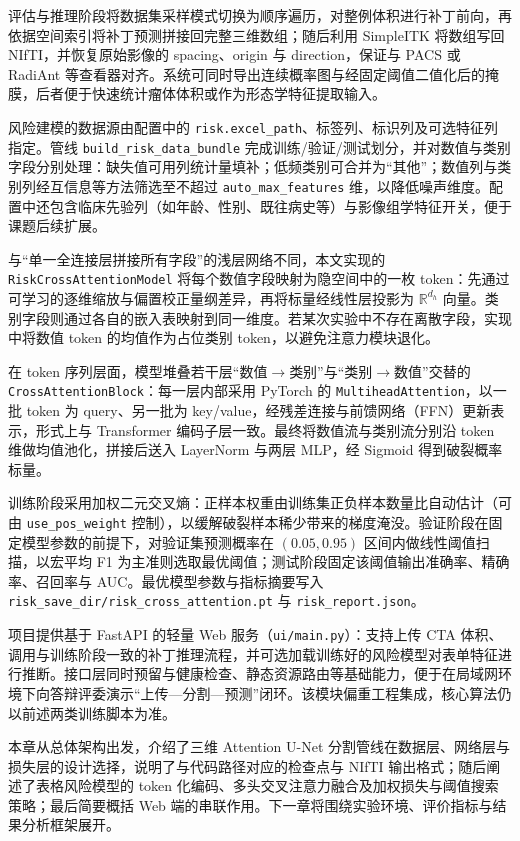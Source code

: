 评估与推理阶段将数据集采样模式切换为顺序遍历，对整例体积进行补丁前向，再依据空间索引将补丁预测拼接回完整三维数组；随后利用 SimpleITK 将数组写回 NIfTI，并恢复原始影像的 spacing、origin 与 direction，保证与 PACS 或 RadiAnt 等查看器对齐。系统可同时导出连续概率图与经固定阈值二值化后的掩膜，后者便于快速统计瘤体体积或作为形态学特征提取输入。

风险建模的数据源由配置中的 \texttt{risk.excel\_path}、标签列、标识列及可选特征列指定。管线 \texttt{build\_risk\_data\_bundle} 完成训练/验证/测试划分，并对数值与类别字段分别处理：缺失值可用列统计量填补；低频类别可合并为“其他”；数值列与类别列经互信息等方法筛选至不超过 \texttt{auto\_max\_features} 维，以降低噪声维度。配置中还包含临床先验列（如年龄、性别、既往病史等）与影像组学特征开关，便于课题后续扩展。

与“单一全连接层拼接所有字段”的浅层网络不同，本文实现的 \texttt{RiskCrossAttentionModel} 将每个数值字段映射为隐空间中的一枚 token：先通过可学习的逐维缩放与偏置校正量纲差异，再将标量经线性层投影为 $\mathbb{R}^{d_h}$ 向量。类别字段则通过各自的嵌入表映射到同一维度。若某次实验中不存在离散字段，实现中将数值 token 的均值作为占位类别 token，以避免注意力模块退化。

在 token 序列层面，模型堆叠若干层“数值$\rightarrow$类别”与“类别$\rightarrow$数值”交替的 \texttt{CrossAttentionBlock}：每一层内部采用 PyTorch 的 \texttt{MultiheadAttention}，以一批 token 为 query、另一批为 key/value，经残差连接与前馈网络（FFN）更新表示，形式上与 Transformer 编码子层一致\cite{vaswani2017}。最终将数值流与类别流分别沿 token 维做均值池化，拼接后送入 LayerNorm 与两层 MLP，经 Sigmoid 得到破裂概率标量。

训练阶段采用加权二元交叉熵：正样本权重由训练集正负样本数量比自动估计（可由 \texttt{use\_pos\_weight} 控制），以缓解破裂样本稀少带来的梯度淹没。验证阶段在固定模型参数的前提下，对验证集预测概率在 $(0.05,0.95)$ 区间内做线性阈值扫描，以宏平均 F1 为主准则选取最优阈值；测试阶段固定该阈值输出准确率、精确率、召回率与 AUC。最优模型参数与指标摘要写入 \texttt{risk\_save\_dir/risk\_cross\_attention.pt} 与 \texttt{risk\_report.json}。

项目提供基于 FastAPI 的轻量 Web 服务（\texttt{ui/main.py}）：支持上传 CTA 体积、调用与训练阶段一致的补丁推理流程，并可选加载训练好的风险模型对表单特征进行推断。接口层同时预留与健康检查、静态资源路由等基础能力，便于在局域网环境下向答辩评委演示“上传—分割—预测”闭环。该模块偏重工程集成，核心算法仍以前述两类训练脚本为准。

本章从总体架构出发，介绍了三维 Attention U-Net 分割管线在数据层、网络层与损失层的设计选择，说明了与代码路径对应的检查点与 NIfTI 输出格式；随后阐述了表格风险模型的 token 化编码、多头交叉注意力融合及加权损失与阈值搜索策略；最后简要概括 Web 端的串联作用。下一章将围绕实验环境、评价指标与结果分析框架展开。
